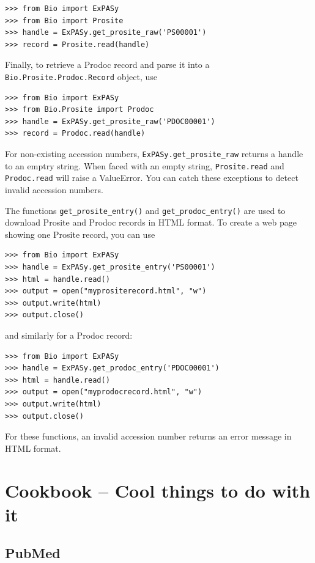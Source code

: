 \documentclass{report}
\begin{document}
\begin{verbatim}
>>> from Bio import ExPASy
>>> from Bio import Prosite
>>> handle = ExPASy.get_prosite_raw('PS00001')
>>> record = Prosite.read(handle)
\end{verbatim}

Finally, to retrieve a Prodoc record and parse it into a \verb|Bio.Prosite.Prodoc.Record| object, use

\begin{verbatim}
>>> from Bio import ExPASy
>>> from Bio.Prosite import Prodoc
>>> handle = ExPASy.get_prosite_raw('PDOC00001')
>>> record = Prodoc.read(handle)
\end{verbatim}

For non-existing accession numbers, \verb|ExPASy.get_prosite_raw| returns a handle to an emptry string. When faced with an empty string, \verb|Prosite.read| and \verb|Prodoc.read| will raise a ValueError. You can catch these exceptions to detect invalid accession numbers.

The functions \verb|get_prosite_entry()| and \verb|get_prodoc_entry()| are used to download Prosite and Prodoc records in HTML format. To create a web page showing one Prosite record, you can use

\begin{verbatim}
>>> from Bio import ExPASy
>>> handle = ExPASy.get_prosite_entry('PS00001')
>>> html = handle.read()
>>> output = open("myprositerecord.html", "w")
>>> output.write(html)
>>> output.close()
\end{verbatim}

and similarly for a Prodoc record:

\begin{verbatim}
>>> from Bio import ExPASy
>>> handle = ExPASy.get_prodoc_entry('PDOC00001')
>>> html = handle.read()
>>> output = open("myprodocrecord.html", "w")
>>> output.write(html)
>>> output.close()
\end{verbatim}

For these functions, an invalid accession number returns an error message in HTML format.

\chapter{Cookbook -- Cool things to do with it}
\label{chapter:cookbook}

\section{PubMed}
\label{sec:pub_med}
\end{document}
